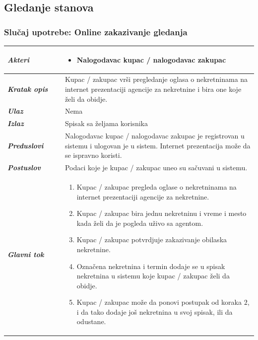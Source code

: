 \documentclass[20pt]{article}
\begin{document}
\newpage
\subsection{\bfseries \Large Gledanje stanova}
\setlength{\parindent}{1cm}
\fontsize{13}{18} \selectfont 
\subsubsection{\bfseries \large Slu\v{c}aj upotrebe: Online zakazivanje gledanja}
\begin{center}
\begin{longtable}{p{0.23\linewidth} p{0.77\linewidth}}
 \hline
 {\it \bfseries Akteri} & \begin{itemize}
    \item Nalogodavac kupac / nalogodavac zakupac
\end{itemize}\\
\hline

 {\it \bfseries Kratak opis} & Kupac / zakupac vr\v si pregledanje oglasa o nekretninama na internet prezentaciji agencije za nekretnine i bira one koje \v zeli da obidje.\\ 
 \hline
 
 {\it \bfseries Ulaz} & Nema\\ 
 \hline
 
 {\it \bfseries Izlaz} & Spisak sa \v zeljama korisnika\\
 \hline
 
 {\it \bfseries Preduslovi} & Nalogodavac kupac / nalogodavac zakupac je registrovan u sistemu i ulogovan je u sistem. Internet prezentacija mo\v ze da se ispravno koristi.\\
 \hline

 {\it \bfseries Postuslov} & Podaci koje je kupac / zakupac uneo su sa\v cuvani u sistemu.\\
 \hline

     {\it \bfseries Glavni tok} &  
     \begin{enumerate}
         \item  Kupac / zakupac pregleda oglase o nekretninama na internet prezentaciji agencije za nekretnine.
         \item  Kupac / zakupac bira jednu nekretninu i vreme i mesto kada \v zeli da je pogleda u\v zivo sa agentom.
         \item  Kupac / zakupac potvrdjuje zakazivanje obilaska nekretnine.
         \item  Označena nekretnina i termin dodaje se u spisak nekretnina u sistemu koje kupac / zakupac želi da obidje.
         \item  Kupac / zakupac mo\v ze da ponovi postupak od koraka $2$, i da tako dodaje jo\v s nekretnina u svoj spisak, ili da odustane.
    \end{enumerate}\\
 \hline


\end{longtable}
\end{center}
\end{document}
